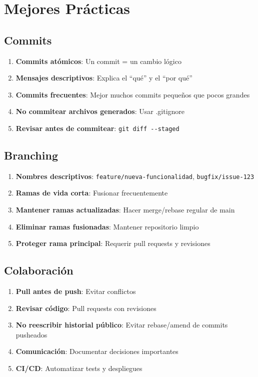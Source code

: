 \documentclass[
  doc,
  floatsintext,
  longtable,
  a4paper,
  nolmodern,
  notxfonts,
  notimes,
  12pt,
  colorlinks=true,linkcolor=blue,citecolor=blue,urlcolor=blue]{apa7}
\providecommand{\tightlist}{%
  \setlength{\itemsep}{0pt}\setlength{\parskip}{0pt}}
\begin{document}
\section{Mejores Prácticas}\label{mejores-pruxe1cticas}

\subsection{Commits}\label{commits-1}

\begin{enumerate}
\def\labelenumi{\arabic{enumi}.}
\tightlist
\item
  \textbf{Commits atómicos}: Un commit = un cambio lógico
\item
  \textbf{Mensajes descriptivos}: Explica el ``qué'' y el ``por qué''
\item
  \textbf{Commits frecuentes}: Mejor muchos commits pequeños que pocos
  grandes
\item
  \textbf{No commitear archivos generados}: Usar .gitignore
\item
  \textbf{Revisar antes de commitear}: \texttt{git\ diff\ -\/-staged}
\end{enumerate}

\subsection{Branching}\label{branching}

\begin{enumerate}
\def\labelenumi{\arabic{enumi}.}
\tightlist
\item
  \textbf{Nombres descriptivos}: \texttt{feature/nueva-funcionalidad},
  \texttt{bugfix/issue-123}
\item
  \textbf{Ramas de vida corta}: Fusionar frecuentemente
\item
  \textbf{Mantener ramas actualizadas}: Hacer merge/rebase regular de
  main
\item
  \textbf{Eliminar ramas fusionadas}: Mantener repositorio limpio
\item
  \textbf{Proteger rama principal}: Requerir pull requests y revisiones
\end{enumerate}

\subsection{Colaboración}\label{colaboraciuxf3n}

\begin{enumerate}
\def\labelenumi{\arabic{enumi}.}
\tightlist
\item
  \textbf{Pull antes de push}: Evitar conflictos
\item
  \textbf{Revisar código}: Pull requests con revisiones
\item
  \textbf{No reescribir historial público}: Evitar rebase/amend de
  commits pusheados
\item
  \textbf{Comunicación}: Documentar decisiones importantes
\item
  \textbf{CI/CD}: Automatizar tests y despliegues
\end{enumerate}
\end{document}

